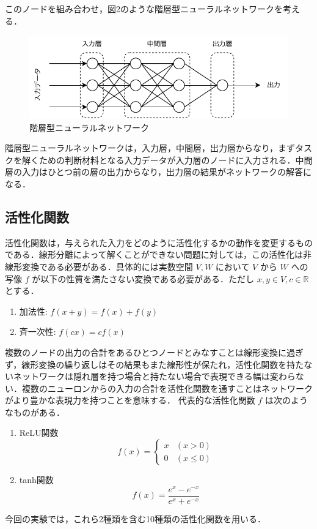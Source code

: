 このノードを組み合わせ，図2のような階層型ニューラルネットワークを考える．

\begin{figure}[h]
    \begin{center}
        \includegraphics[scale=0.8]{img/forwardprop.pdf}
        \caption{階層型ニューラルネットワーク}
    \end{center}
\end{figure}

階層型ニューラルネットワークは，入力層，中間層，出力層からなり，まずタスクを解くための判断材料となる入力データが入力層のノードに入力される．中間層の入力はひとつ前の層の出力からなり，出力層の結果がネットワークの解答になる．

\clearpage
\subsection{活性化関数}
活性化関数は，与えられた入力をどのように活性化するかの動作を変更するものである．線形分離によって解くことができない問題に対しては，この活性化は非線形変換である必要がある\cite{活性化関数}．具体的には実数空間 $ V, W $ において  $ V $ から $ W $ への写像 $ f $ が以下の性質を満たさない変換である必要がある．ただし $ x, y \in V, c \in \mathbb{R} $ とする．

\begin{enumerate}
    \item 加法性: $ f(x + y) = f(x) + f(y) $ 
    \item 斉一次性: $ f(cx) = cf(x) $
\end{enumerate}

複数のノードの出力の合計をあるひとつノードとみなすことは線形変換に過ぎず，線形変換の繰り返しはその結果もまた線形性が保たれ，活性化関数を持たないネットワークは隠れ層を持つ場合と持たない場合で表現できる幅は変わらない．複数のニューロンからの入力の合計を活性化関数を通すことはネットワークがより豊かな表現力を持つことを意味する．
代表的な活性化関数 $ f $ は次のようなものがある．

\begin{enumerate}
    \item ReLU関数
    \begin{equation}
        f(x) = 
        \begin{cases}
        x & (x > 0)\\
        0 & (x \leq 0)
        \end{cases}
    \end{equation}

    \item tanh関数
    \begin{equation}
        f(x) = \frac{e^{x} - e^{-x}}{e^{x} + e^{-x}}
    \end{equation}
\end{enumerate}

今回の実験では，これら2種類を含む10種類の活性化関数を用いる．